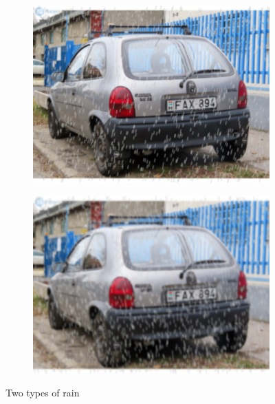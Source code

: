 \begin{figure}[!htb]
    \begin{subfigure}[b]{.45\textwidth}
        \includegraphics[width=\textwidth]{figures/lightrain.jpg}
    \end{subfigure}
    \hfill
    \begin{subfigure}[b]{.45\textwidth}
        \includegraphics[width=\textwidth]{figures/rain.jpg}
    \end{subfigure}
    \hfill
    \caption{Two types of rain}
    \label{fig:wheater-raines}
\end{figure}
